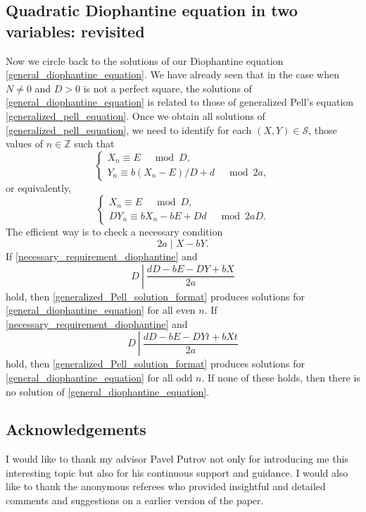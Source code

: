 \documentclass[pdftex]{sigma}
\numberwithin{equation}{section}
\begin{document}
\subsection{Quadratic Diophantine equation in two variables: revisited}
Now we circle back to the solutions of our Diophantine equation \eqref{general_diophantine_equation}. We have already seen that in the case when $ N\neq 0 $ and $ D>0 $ is not a perfect square, the solutions of \eqref{general_diophantine_equation} is related to those of generalized Pell's equation \eqref{generalized_pell_equation}. Once we obtain all solutions of \eqref{generalized_pell_equation}, we need to identify for each $ (X,Y)\in \mathcal{S} $, those values of $ n\in \mathbb{Z} $ such that
\begin{equation*}
	\begin{cases}
		X_n\equiv E \quad \bmod  D,\\
		Y_n\equiv b(X_n-E)/D+d \quad \bmod 2a,
	\end{cases}
\end{equation*}
or equivalently,
\begin{equation*}
	\begin{cases}
		X_n\equiv E\quad \bmod  D,\\
		DY_n\equiv bX_n-bE+Dd\quad \bmod 2aD.
	\end{cases}
\end{equation*}
The efficient way \cite{sawilla} is to check a necessary condition
\begin{equation}\label{necessary_requirement_diophantine}
	2a \mid X-bY.
\end{equation}
If \eqref{necessary_requirement_diophantine} and
\begin{equation*}
	D~\left|~\frac{dD-bE-DY+bX}{2a}\right.
\end{equation*}
hold, then \eqref{generalized_Pell_solution_format} produces solutions for \eqref{general_diophantine_equation} for all even $ n $. If \eqref{necessary_requirement_diophantine} and
\begin{equation*}
	D~\left|~\frac{dD-bE-DYt+bXt}{2a}\right.
\end{equation*}
hold, then \eqref{generalized_Pell_solution_format} produces solutions for \eqref{general_diophantine_equation} for all odd $ n $. If none of these holds, then there is no solution of \eqref{general_diophantine_equation}.

\subsection*{Acknowledgements}
I would like to thank my advisor Pavel Putrov not only for introducing me this interesting topic but also for his continuous support and guidance. I would also like to thank the anonymous referees who provided insightful and detailed comments and suggestions on a earlier version of the paper.
\end{document}

